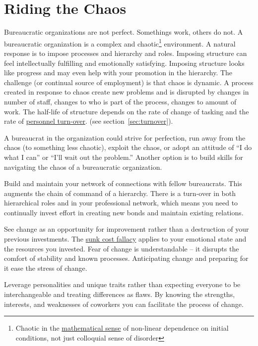 \section{Riding the Chaos}

Bureaucratic organizations are not perfect. Somethings work, others do not. A bureaucratic organization is a complex and chaotic\footnote{Chaotic in the \href{https://en.wikipedia.org/wiki/Chaos_theory}{mathematical sense} of non-linear dependence on initial conditions, not just colloquial sense of disorder} environment. A natural response is to impose processes and hierarchy and roles. Imposing structure can feel intellectually fulfilling and emotionally satisfying. Imposing structure looks like progress and may even help with your promotion in the hierarchy. The challenge (or continual source of employment) is that chaos is dynamic. A process created in response to chaos create new problems and is disrupted by changes in number of staff, changes to who is part of the process, changes to amount of work. The half-life of structure depends on the rate of change of tasking and the rate of \hyperref[sec:turnover]{personnel turn-over}. 
\ifsectionref
(see section~\ref{sec:turnover}).
\fi

A bureaucrat in the organization could strive for perfection, run away from the chaos (to something less chaotic), exploit the chaos, or adopt an attitude of ``I do what I can'' or ``I'll wait out the problem.'' 
Another option is to build skills for navigating the chaos of a bureaucratic organization.

Build and maintain your network of connections with fellow bureaucrats. 
This augments the chain of command of a hierarchy. There is a turn-over in both hierarchical roles and in your professional network, which means you need to continually invest effort in creating new bonds and maintain existing relations. 

See change as an opportunity for improvement rather than a destruction of your previous investments. The \href{https://en.wikipedia.org/wiki/Sunk_cost}{sunk cost fallacy} applies to your emotional state and the resources you invested. Fear of change is understandable -- it disrupts the comfort of stability and known processes. Anticipating change and preparing for it ease the stress of change.

Leverage personalities and unique traits rather than expecting everyone to be interchangeable and treating differences as flaws. 
By knowing the strengths, interests, and weaknesses of coworkers you can facilitate the process of change. 